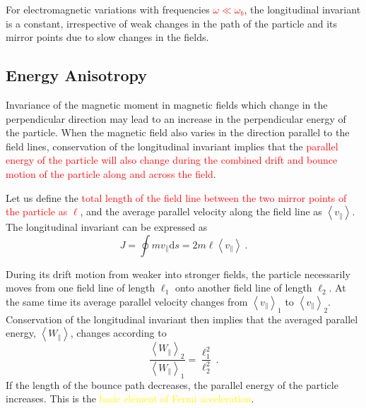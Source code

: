 \documentclass[12pt,a4paper]{article}
\newcommand{\dif}{\mathrm{d}}
\begin{document}
For electromagnetic variations with frequencies \textcolor{red}{$\omega \ll \omega_b$}, the longitudinal invariant is a constant, irrespective of weak changes in the path of the particle and its mirror points due to slow changes in the fields.

\subsection{Energy Anisotropy}
\cite{1996bspp.book.....B} Invariance of the magnetic moment in magnetic fields which change in the perpendicular direction may lead to an increase in the perpendicular energy of the particle. When the magnetic field also varies in the direction parallel to the field lines, conservation of the longitudinal invariant implies that the \textcolor{red}{parallel energy of the particle will also change during the combined drift and bounce motion of the particle along and across the field}.

Let us define the \textcolor{red}{total length of the field line between the two mirror points of the particle as $\ell$}, and the average parallel velocity along the field line as $\left\langle v_\parallel \right\rangle$. The longitudinal invariant can be expressed as
\begin{equation}
J = \oint m v_\parallel \dif s = 2m \ell \left\langle v_\parallel \right\rangle ~.
\end{equation}

During its drift motion from weaker into stronger fields, the particle necessarily moves from one field line of length $\ell_1$ onto another field line of length $\ell_2$. At the same time its average parallel velocity changes from $\left\langle v_\parallel \right\rangle_1$ to $\left\langle v_\parallel \right\rangle_2$. Conservation of the longitudinal invariant then implies that the averaged parallel energy, $\left\langle W_\parallel \right\rangle$, changes according to
\begin{equation}
\dfrac{\left\langle W_\parallel \right\rangle_2}{\left\langle W_\parallel \right\rangle_1} = \dfrac{\ell^2_1}{\ell^2_2}  ~.
\end{equation}
If the length of the bounce path decreases, the parallel energy of the particle increases. This is the \textcolor{yellow}{basic element of Fermi acceleration}.
\end{document}
